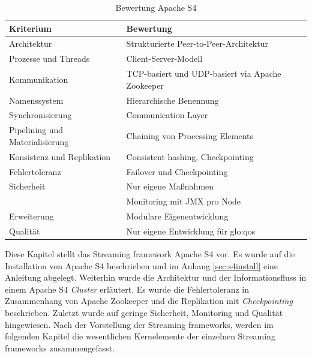 \begin{table}[ht!]
	\centering
		\begin{tabular}{@{}ll@{}} \toprule
			\textbf{Kriterium} & \textbf{Bewertung} \\ \midrule
			Architektur & Strukturierte Peer-to-Peer-Architektur \\
			Prozesse und Threads & Client-Server-Modell \\
			Kommunikation & TCP-basiert und UDP-basiert via Apache Zookeeper \\
			Namenssystem & Hierarchische Benennung \\
			Synchronisierung & Communication Layer \\
			Pipelining und Materialisierung & Chaining von Processing Elements  \\
			Konsistenz und Replikation & Consistent hashing, Checkpointing \\
			Fehlertoleranz & Failover und Checkpointing \\ 
			Sicherheit & Nur eigene Maßnahmen \\
			& Monitoring mit JMX pro Node \\
			Erweiterung & Modulare Eigenentwicklung \\
			Qualität & Nur eigene Entwicklung für \gls{glo:qos}  \\
			\bottomrule			
		\end{tabular}
	\caption{Bewertung Apache S4}
	\label{tab:bews4}
\end{table}

Diese Kapitel stellt das Streaming framework Apache S4 vor. Es wurde auf die Installation von Apache S4 beschrieben und im Anhang \ref{sec:s4install} eine Anleitung abgelegt. Weiterhin wurde die Architektur und der Informationsfluss in einem Apache S4 \textit{Cluster} erläutert. Es wurde die Fehlertoleranz in Zusammenhang von Apache Zookeeper und die Replikation mit \textit{Checkpointing} beschrieben. Zuletzt wurde auf geringe Sicherheit, Monitoring und Qualität hingewiesen. Nach der Vorstellung der Streaming frameworks, werden im folgenden Kapitel die wesentlichen Kernelemente der einzelnen Streaming frameworks zusammengefasst.